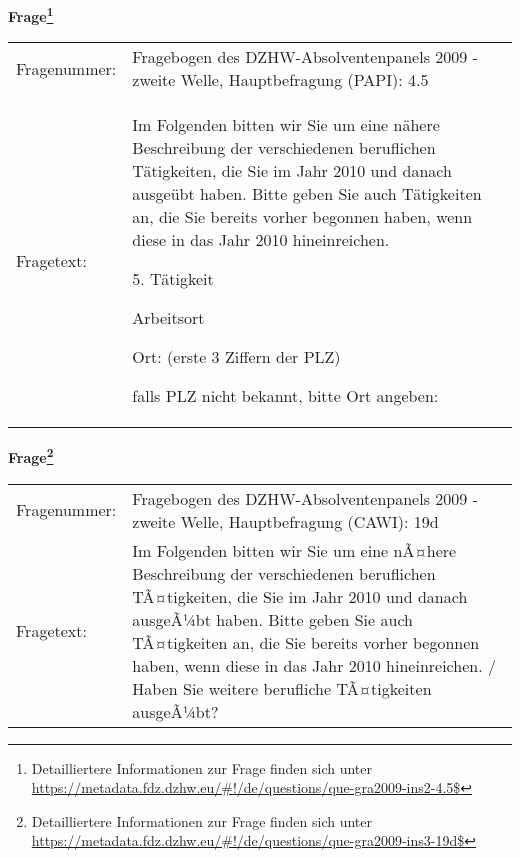 				\vspace*{0.5cm}
                \noindent\textbf{Frage\footnote{Detailliertere Informationen zur Frage finden sich unter
		              \url{https://metadata.fdz.dzhw.eu/\#!/de/questions/que-gra2009-ins2-4.5$}}}\\
				\begin{tabularx}{\hsize}{@{}lX}
					Fragenummer: &
					  Fragebogen des DZHW-Absolventenpanels 2009 - zweite Welle, Hauptbefragung (PAPI):
					  4.5
 \\
					Fragetext: & Im Folgenden bitten wir Sie um eine nähere Beschreibung der verschiedenen beruflichen Tätigkeiten, die Sie im Jahr 2010 und danach ausgeübt haben. Bitte geben Sie auch Tätigkeiten an, die Sie bereits vorher begonnen haben, wenn diese in das Jahr 2010 hineinreichen.\par  5. Tätigkeit\par  Arbeitsort\par  Ort: (erste 3 Ziffern der PLZ)\par  falls PLZ nicht bekannt, bitte Ort angeben: \\
				\end{tabularx}
				\vspace*{0.5cm}
                \noindent\textbf{Frage\footnote{Detailliertere Informationen zur Frage finden sich unter
		              \url{https://metadata.fdz.dzhw.eu/\#!/de/questions/que-gra2009-ins3-19d$}}}\\
				\begin{tabularx}{\hsize}{@{}lX}
					Fragenummer: &
					  Fragebogen des DZHW-Absolventenpanels 2009 - zweite Welle, Hauptbefragung (CAWI):
					  19d
 \\
					Fragetext: & Im Folgenden bitten wir Sie um eine nÃ¤here Beschreibung der verschiedenen beruflichen TÃ¤tigkeiten, die Sie im Jahr 2010 und danach ausgeÃ¼bt haben. Bitte geben Sie auch TÃ¤tigkeiten an, die Sie bereits vorher begonnen haben, wenn diese in das Jahr 2010 hineinreichen. / Haben Sie weitere berufliche TÃ¤tigkeiten ausgeÃ¼bt? \\
				\end{tabularx}





